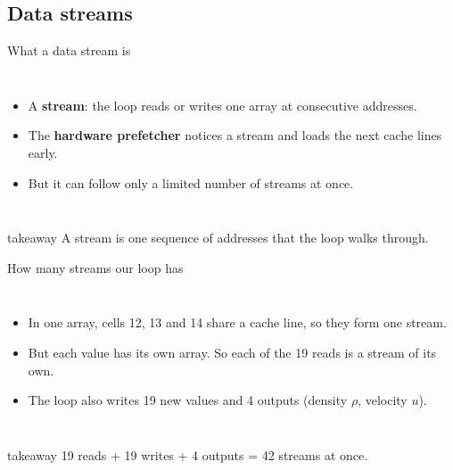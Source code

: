 \documentclass[aspectratio=169,10pt,t]{beamer}
\newcommand{\term}[1]{\textcolor{psblue!85!black}{\textbf{#1}}} %
\newcommand{\takeaway}[1]{\par\vfill
  \begin{beamercolorbox}[wd=\textwidth,sep=4pt,rounded=true]{takeaway}
    \small #1
  \end{beamercolorbox}}
\begin{document}
\subsection{Data streams}
\begin{frame}{What a data stream is}
  \begin{columns}[T,onlytextwidth]
    \vspace{1mm}
    \centering
    \vspace{1mm}
    \begin{itemize}\small
      \item A \term{stream}: the loop reads or writes one array at consecutive addresses.
      \item The \term{hardware prefetcher} notices a stream and loads the next cache lines early.
      \item<4-> But it can follow only a limited number of streams at once.
    \end{itemize}
  \end{columns}
  \takeaway{A stream is one sequence of addresses that the loop walks through.}
\end{frame}

\begin{frame}{How many streams our loop has}
  \begin{columns}[T,onlytextwidth]
    \vspace{1mm}
    
    \vspace{1mm}
    \begin{itemize}\small
      \item In one array, cells 12, 13 and 14 share a cache line, so they form one stream.
      \item<2-> But each value has its own array. So each of the 19 reads is a stream of its own.
      \item<3-> The loop also writes 19 new values and 4 outputs (density $\rho$, velocity $u$).
    \end{itemize}
  \end{columns}
  \takeaway{19 reads + 19 writes + 4 outputs = 42 streams at once.}
\end{frame}

\end{document}

